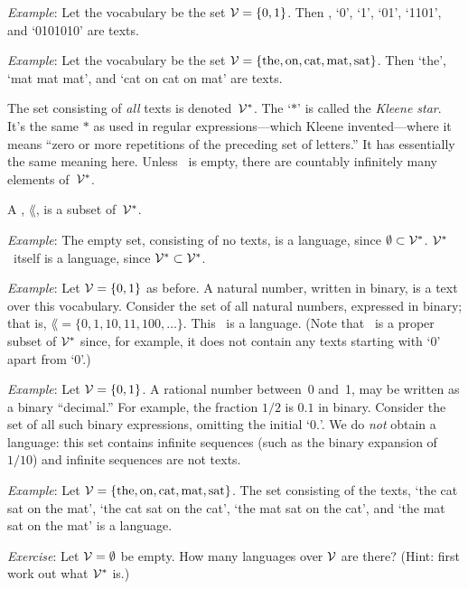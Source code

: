 \documentclass{article}
\begin{document}
\emph{Example}: Let the vocabulary be the set $\mathcal{V}=\{0, 1\}$.  Then \emptytext, `0', `1', `01', `1101', and `0101010' are texts.

\emph{Example}: Let the vocabulary be the set $\mathcal{V} = \{\text{the}, \text{on}, \text{cat}, \text{mat}, \text{sat}\}$.  Then `the', `mat mat mat', and `cat on cat on mat' are texts.

The set consisting of \emph{all} texts is denoted~$\mathcal{V}^*$. The `$*$' is called the \emph{Kleene star}. It's the same $*$ as used in regular expressions---which Kleene invented---where it means ``zero or more repetitions of the preceding set of letters.'' It has essentially the same meaning here. Unless \vocab\ is empty, there are countably infinitely many elements of~$\mathcal{V}^*$.

A , $\lang$, is a subset of~$\mathcal{V}^*$.

\emph{Example}: The empty set, consisting of no texts, is a language, since $\emptyset\subset\mathcal{V}^*$. $\mathcal{V}^*$~itself is a language, since $\mathcal{V}^*\subset\mathcal{V}^*$.

\emph{Example}: Let $\mathcal{V}=\{0,1\}$ as before. A natural number, written in binary, is a text over this vocabulary. Consider the set of all natural numbers, expressed in binary; that is, $\lang = \{\text{0}, \text{1}, \text{10}, \text{11}, \text{100}, \dotsc\}$. This \lang\ is a language. (Note that \lang\ is a proper subset of $\mathcal{V}^*$ since, for example, it does not contain any texts starting with `0' apart from `0'.)

\emph{Example}: Let $\mathcal{V}=\{0,1\}$. A rational number between~0 and~1, may be written as a binary ``decimal.'' For example, the fraction $1/2$ is $0.1$ in binary. Consider the set of all such binary expressions, omitting the initial `$0.$'. We do \emph{not} obtain a language: this set contains infinite sequences (such as the binary expansion of $1/10$) and infinite sequences are not texts.

\emph{Example}: Let $\mathcal{V} =  \{\text{the}, \text{on}, \text{cat}, \text{mat}, \text{sat}\}$. The set consisting of the texts, `the cat sat on the mat', `the cat sat on the cat', `the mat sat on the cat', and `the mat sat on the mat' is a language.  

\emph{Exercise}: Let $\mathcal{V}=\emptyset$ be empty. How many languages over $\mathcal{V}$ are there? (Hint: first work out what $\mathcal{V}^*$ is.)
\end{document}
